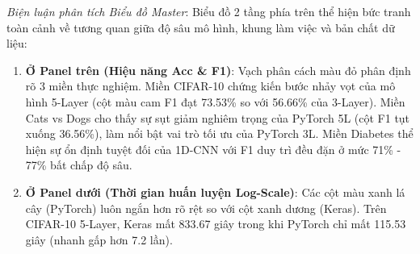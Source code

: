 \documentclass[12pt,a4paper]{report}
\begin{document}
\textit{Biện luận phân tích Biểu đồ Master}:
Biểu đồ 2 tầng phía trên thể hiện bức tranh toàn cảnh về tương quan giữa độ sâu mô hình, khung làm việc và bản chất dữ liệu:
\begin{enumerate}
    \item \textbf{Ở Panel trên (Hiệu năng Acc \& F1)}: Vạch phân cách màu đỏ phân định rõ 3 miền thực nghiệm. Miền CIFAR-10 chứng kiến bước nhảy vọt của mô hình 5-Layer (cột màu cam F1 đạt 73.53\% so với 56.66\% của 3-Layer). Miền Cats vs Dogs cho thấy sự sụt giảm nghiêm trọng của PyTorch 5L (cột F1 tụt xuống 36.56\%), làm nổi bật vai trò tối ưu của PyTorch 3L. Miền Diabetes thể hiện sự ổn định tuyệt đối của 1D-CNN với F1 duy trì đều đặn ở mức 71\% - 77\% bất chấp độ sâu.
    \item \textbf{Ở Panel dưới (Thời gian huấn luyện Log-Scale)}: Các cột màu xanh lá cây (PyTorch) luôn ngắn hơn rõ rệt so với cột xanh dương (Keras). Trên CIFAR-10 5-Layer, Keras mất 833.67 giây trong khi PyTorch chỉ mất 115.53 giây (nhanh gấp hơn 7.2 lần).
\end{enumerate}
\end{document}
